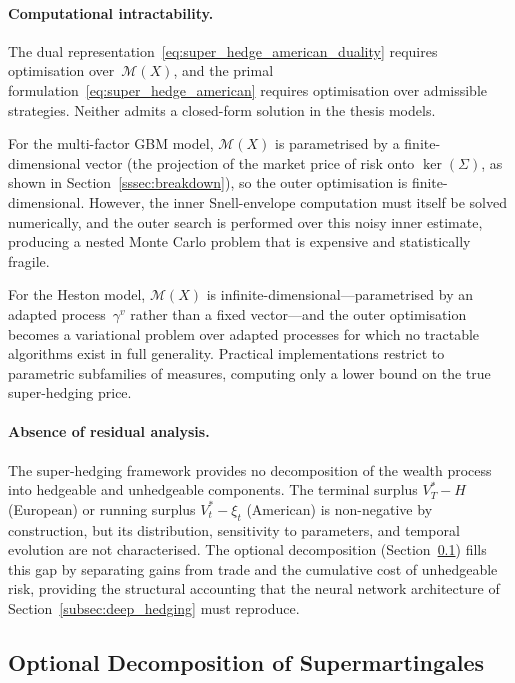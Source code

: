 \paragraph{Computational intractability.}
The dual representation~\eqref{eq:super_hedge_american_duality} requires
optimisation over~$\mathcal{M}(X)$, and the primal
formulation~\eqref{eq:super_hedge_american} requires optimisation over
admissible strategies.  Neither admits a closed-form solution in the
thesis models.

For the multi-factor GBM model, $\mathcal{M}(X)$ is parametrised by a
finite-dimensional vector (the projection of the market price of risk onto
$\ker(\Sigma)$, as shown in Section~\ref{sssec:breakdown}), so the outer
optimisation is finite-dimensional.  However, the inner Snell-envelope
computation must itself be solved numerically, and the outer search is
performed over this noisy inner estimate, producing a nested Monte Carlo
problem that is expensive and statistically fragile.

For the Heston model, $\mathcal{M}(X)$ is
infinite-dimensional---parametrised by an adapted process~$\gamma^v$
rather than a fixed vector---and the outer optimisation becomes a
variational problem over adapted processes for which no tractable
algorithms exist in full generality.  Practical implementations restrict
to parametric subfamilies of measures, computing only a lower bound on the
true super-hedging price.

\paragraph{Absence of residual analysis.}
The super-hedging framework provides no decomposition of the wealth
process into hedgeable and unhedgeable components.  The terminal surplus
$V^*_T - H$ (European) or running surplus $V^*_t - \xi_t$ (American) is
non-negative by construction, but its distribution, sensitivity to
parameters, and temporal evolution are not characterised.  The optional
decomposition (Section~\ref{subsec:optional_decomposition}) fills this gap
by separating gains from trade and the cumulative cost of unhedgeable
risk, providing the structural accounting that the neural network
architecture of Section~\ref{subsec:deep_hedging} must reproduce.

\subsection{Optional Decomposition of Supermartingales}
\label{subsec:optional_decomposition}


